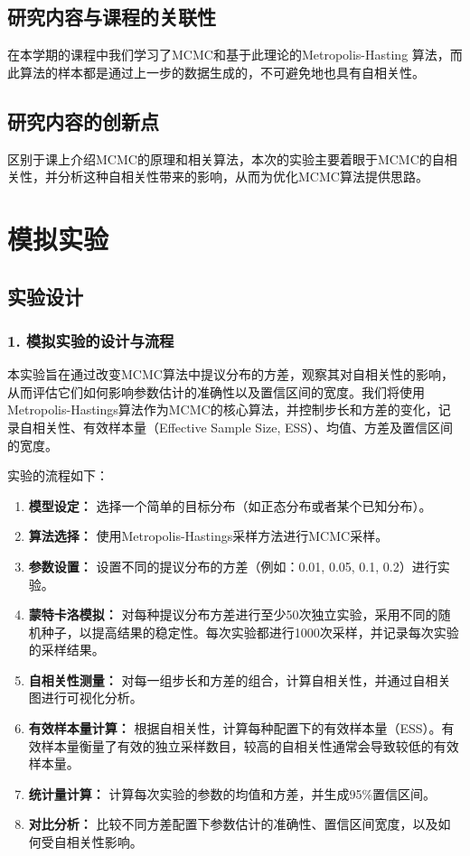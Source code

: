 \documentclass[12pt]{article}
\begin{document}
\subsection{研究内容与课程的关联性}
在本学期的课程中我们学习了MCMC和基于此理论的Metropolis-Hasting 算法，而此算法的样本都是通过上一步的数据生成的，不可避免地也具有自相关性。

\subsection{研究内容的创新点}
区别于课上介绍MCMC的原理和相关算法，本次的实验主要着眼于MCMC的自相关性，并分析这种自相关性带来的影响，从而为优化MCMC算法提供思路。


\section{模拟实验}

\subsection*{实验设计}

\subsubsection*{1. 模拟实验的设计与流程}

本实验旨在通过改变MCMC算法中提议分布的方差，观察其对自相关性的影响，从而评估它们如何影响参数估计的准确性以及置信区间的宽度。我们将使用Metropolis-Hastings算法作为MCMC的核心算法，并控制步长和方差的变化，记录自相关性、有效样本量（Effective Sample Size, ESS）、均值、方差及置信区间的宽度。

实验的流程如下：

\begin{enumerate}
	\item \textbf{模型设定：} 选择一个简单的目标分布（如正态分布或者某个已知分布）。
	\item \textbf{算法选择：} 使用Metropolis-Hastings采样方法进行MCMC采样。
	\item \textbf{参数设置：} 设置不同的提议分布的方差（例如：0.01, 0.05, 0.1, 0.2）进行实验。
	\item \textbf{蒙特卡洛模拟：} 对每种提议分布方差进行至少50次独立实验，采用不同的随机种子，以提高结果的稳定性。每次实验都进行1000次采样，并记录每次实验的采样结果。
	\item \textbf{自相关性测量：} 对每一组步长和方差的组合，计算自相关性，并通过自相关图进行可视化分析。
	\item \textbf{有效样本量计算：} 根据自相关性，计算每种配置下的有效样本量（ESS）。有效样本量衡量了有效的独立采样数目，较高的自相关性通常会导致较低的有效样本量。
	\item \textbf{统计量计算：} 计算每次实验的参数的均值和方差，并生成95\%置信区间。
	\item \textbf{对比分析：} 比较不同方差配置下参数估计的准确性、置信区间宽度，以及如何受自相关性影响。
\end{enumerate}
\end{document}
